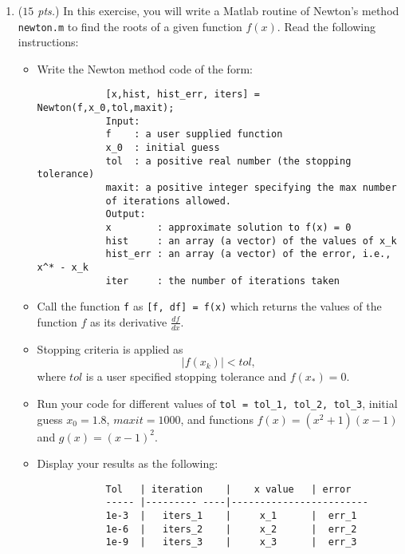 \documentclass[a4paper,11pt]{article}
\begin{document}
\begin{enumerate}
\item (\textit{$15$ pts.}) In this exercise, you will write a Matlab routine of Newton's method \texttt{newton.m} to find the  roots of a given function $f(x)$. Read the following  instructions:
\begin{itemize}
	\item Write the Newton method code of the form:
		\begin{verbatim}
			[x,hist, hist_err, iters] = Newton(f,x_0,tol,maxit); 	
			Input:
			f    : a user supplied function
			x_0  : initial guess
			tol  : a positive real number (the stopping tolerance)
			maxit: a positive integer specifying the max number
			of iterations allowed.	
			Output:
			x        : approximate solution to f(x) = 0
			hist     : an array (a vector) of the values of x_k
			hist_err : an array (a vector) of the error, i.e.,  x^* - x_k
			iter     : the number of iterations taken
		\end{verbatim}
	\item Call the function \texttt{f} as \texttt{[f, df] = f(x)} which returns the values of the function $f$ as its derivative $\frac{d f}{d x}$.
	\item Stopping criteria is applied as
		\[
		\rvert f(x_k) \lvert < tol,
		\]
		where $ tol$ is a user specified stopping tolerance and $ f(x_*) = 0 $.
	\item Run your  code for different values of  \texttt{tol = tol\_1, tol\_2, tol\_3}, initial guess $ x_0 = 1.8 $, $maxit=1000$, and functions $f(x) = (x^2 +1)(x-1)$ and $g(x)=(x-1)^2$.
		\item Display your results as the following:
		\begin{verbatim}
			Tol   | iteration    |    x value   | error
			----- |--------- ----|------------------------
			1e-3  |   iters_1    |     x_1      |  err_1
			1e-6  |   iters_2    |     x_2      |  err_2
			1e-9  |   iters_3    |     x_3      |  err_3
		\end{verbatim}
	\end{itemize}


\end{enumerate}
\end{document}
